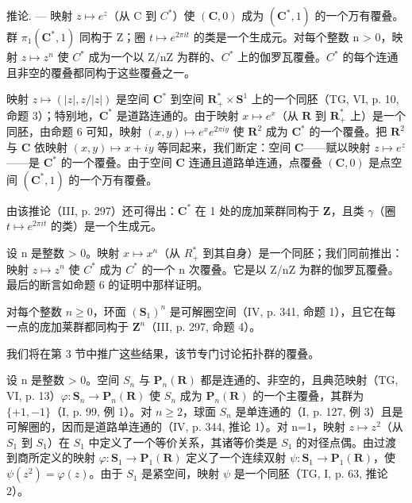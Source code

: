 推论. --- 映射 \(z \mapsto e^{z}\)（从 C 到 \(C^{*}\)）使 \((\mathbf{C},0)\) 成为 \((\mathbf{C}^{*},1)\) 的一个万有覆叠。群 \(\pi_{1}(\mathbf{C}^{*},1)\) 同构于 Z；圈 \(t \mapsto e^{2\pi it}\) 的类是一个生成元。对每个整数 n \textgreater{} 0，映射 \(z \mapsto z^{n}\) 使 \(C^{*}\) 成为一个以 Z/nZ 为群的、\(C^{*}\) 上的伽罗瓦覆叠。\(C^{*}\) 的每个连通且非空的覆叠都同构于这些覆叠之一。

映射 \(z \mapsto (|z|, z/|z|)\) 是空间 \(\mathbf{C}^*\) 到空间 \(\mathbf{R}_+^* \times \mathbf{S}^1\) 上的一个同胚（TG, VI, p. 10, 命题 3）；特别地，\(\mathbf{C}^*\) 是道路连通的。由于映射 \(x \mapsto e^x\)（从 \(\mathbf{R}\) 到 \(\mathbf{R}_+^*\) 上）是一个同胚，由命题 6 可知，映射 \((x, y) \mapsto e^x e^{2\pi iy}\) 使 \(\mathbf{R}^2\) 成为 \(\mathbf{C}^*\) 的一个覆叠。把 \(\mathbf{R}^2\) 与 \(\mathbf{C}\) 依映射 \((x, y) \mapsto x + iy\) 等同起来，我们断定：空间 \(\mathbf{C}\)——赋以映射 \(z \mapsto e^z\)——是 \(\mathbf{C}^*\) 的一个覆叠。由于空间 \(\mathbf{C}\) 连通且道路单连通，点覆叠 \((\mathbf{C}, 0)\) 是点空间 \((\mathbf{C}^*, 1)\) 的一个万有覆叠。

由该推论（III, p. 297）还可得出：\(\mathbf{C}^*\) 在 1 处的庞加莱群同构于 \(\mathbf{Z}\)，且类 \(\gamma\)（圈 \(t \mapsto e^{2\pi it}\) 的类）是一个生成元。

  设 n 是整数 \textgreater{} 0。映射 \(x \mapsto x^{n}\)（从 \(R_{+}^{*}\) 到其自身）是一个同胚；我们同前推出：映射 \(z \mapsto z^{n}\) 使 \(C^{*}\) 成为 \(C^{*}\) 的一个 n 次覆叠。它是以 Z/nZ 为群的伽罗瓦覆叠。最后的断言如命题 6 的证明中那样证明。

对每个整数 \(n \geqslant 0\)，环面 \((\mathbf{S}_{1})^{n}\) 是可解圈空间（IV, p. 341, 命题 1），且它在每一点的庞加莱群都同构于 \(\mathbf{Z}^{n}\)（III, p. 297, 命题 4）。

我们将在第 3 节中推广这些结果，该节专门讨论拓扑群的覆叠。


设 n 是整数 \textgreater{} 0。空间 \(S_{n}\) 与 \(\mathbf{P}_{n}(\mathbf{R})\) 都是连通的、非空的，且典范映射（TG, VI, p. 13）\(\varphi\colon\mathbf{S}_{n}\to\mathbf{P}_{n}(\mathbf{R})\) 使 \(S_{n}\) 成为 \(\mathbf{P}_{n}(\mathbf{R})\) 的一个主覆叠，其群为 \(\{+1,-1\}\)（I, p. 99, 例 1）。对 \(n\geqslant2\)，球面 \(S_{n}\) 是单连通的（I, p. 127, 例 3）且是可解圈的，因而是道路单连通的（IV, p. 344, 推论 1）。对 n=1，映射 \(z\mapsto z^{2}\)（从 \(S_{1}\) 到 \(S_{1}\)）在 \(S_{1}\) 中定义了一个等价关系，其诸等价类是 \(S_{1}\) 的对径点偶。由过渡到商所定义的映射 \(\varphi\colon\mathbf{S}_{1}\to\mathbf{P}_{1}(\mathbf{R})\) 定义了一个连续双射 \(\psi\colon\mathbf{S}_{1}\to\mathbf{P}_{1}(\mathbf{R})\)，使 \(\psi(z^{2})=\varphi(z)\)。由于 \(S_{1}\) 是紧空间，映射 \(\psi\) 是一个同胚（TG, I, p. 63, 推论 2）。

